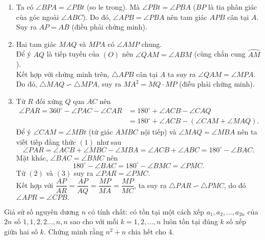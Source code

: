 \begin{ex}
{\begin{center}
	\end{center}
	\begin{enumerate}[1)]
	\item Ta có $\angle BPA=\angle PBt$ (so le trong). Mà $\angle PBt=\angle PBA$ ($BP$ là tia phân giác của góc ngoài $\angle ABC$). Do đó, $\angle APB=\angle PBA$ nên tam giác $APB$ cân tại $A$. Suy ra $AP=AB$ (điều phải chứng minh).
	\item Hai tam giác $MAQ$ và $MPA$ có $\angle AMP$ chung.\\ Để ý $AQ$ là tiếp tuyến của $(O)$ nên $\angle QAM=\angle ABM$ (cùng chắn cung $\wideparen{AM}$).\\Kết hợp với chứng minh trên, $\triangle APB$ cân tại $A$ ta suy ra $\angle QAM=\angle MPA.$\\ Do đó, $\triangle MAQ\backsim \triangle MPA$, suy ra $MA^2=MQ\cdot MP$ (điều phải chứng minh).
	\item Từ $R$ đối xứng $Q$ qua $AC$ nên 
	\begin{align*}
		\angle{PAR}=360^\circ-\angle{PAC}-\angle{CAR}&=180^\circ +\angle{ACB}-\angle{CAQ}\\&=180^\circ +\angle{ACB}-(\angle{CAM}+\angle{MAQ}).\tag{1}
	\end{align*}
 Để ý $\angle CAM=\angle MBt$ (tứ giác $AMBC$ nội tiếp) và $\angle MAQ=\angle MBA $ nên ta viết tiếp đẳng thức $(1)$ như sau  
	\[\angle PAR=\angle ACB +\angle MBC-\angle MBA=\angle ACB+\angle ABC=180^\circ-\angle BAC.\tag{2}\]
	Mặt khác, $\angle BAC=\angle BMC$ nên \[180^\circ-\angle BAC=180^\circ-\angle BMC=\angle PMC.\tag{3}\]
	Từ $(2)$ và $(3)$ suy ra $\angle PAR=\angle PMC.$
\\ Kết hợp với $\dfrac{AP}{AR}=\dfrac{AP}{AQ}=\dfrac{MP}{MA}=\dfrac{MP}{MC}$, ta suy ra $\triangle PAR\backsim \triangle PMC$, do đó $\angle{APR}=\angle{CPB}.$
	\end{enumerate}
		
	}
\end{ex}

\begin{ex}%
	Giả sử số nguyên dương $n$ có tính chất: có tồn tại một cách xếp $a_1,a_2,\ldots ,a_{2n}$ của $2n$ số $1,1,2,2\ldots ,n,n$ sao cho với mỗi $k=1,2,\ldots ,n$ luôn tồn tại đúng $k$ số xếp giữa hai số $k$. Chứng minh rằng $n^2+n$ chia hết cho $4$.
\end{ex}

